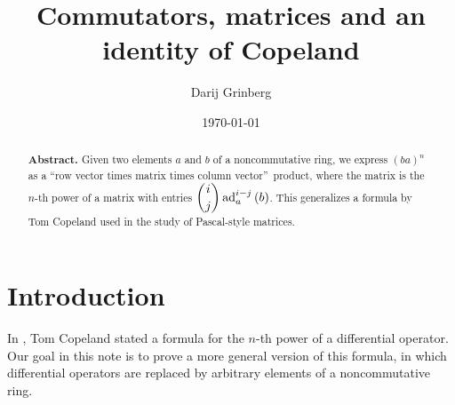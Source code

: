 \documentclass[numbers=enddot,12pt,final,onecolumn,notitlepage]{scrartcl}%
\theoremstyle{definition}
\begin{document}
\title{Commutators, matrices and an identity of Copeland}
\author{Darij Grinberg}
\date{
\today
}
\maketitle

\begin{abstract}
\textbf{Abstract.} Given two elements $a$ and $b$ of a noncommutative ring, we
express $\left(  ba\right)  ^{n}$ as a \textquotedblleft row vector times
matrix times column vector\textquotedblright\ product, where the matrix is the
$n$-th power of a matrix with entries $\dbinom{i}{j}\operatorname*{ad}%
\nolimits_{a}^{i-j}\left(  b\right)  $. This generalizes a formula by Tom
Copeland used in the study of Pascal-style matrices.

\end{abstract}
\tableofcontents

\section{Introduction}

In \cite{MO337766}, Tom Copeland stated a formula for the $n$-th power of a
differential operator. Our goal in this note is to prove a more general
version of this formula, in which differential operators are replaced by
arbitrary elements of a noncommutative ring.
\end{document}
